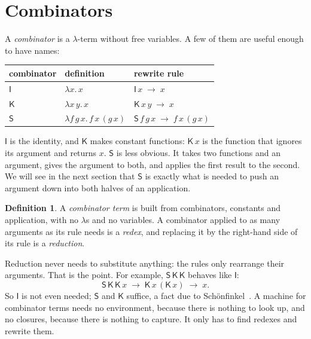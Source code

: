 \documentclass[11pt,a4paper]{article}
\newcommand{\cmb}[1]{\textsf{#1}}
\newcommand{\I}{\cmb{I}}
\newcommand{\K}{\cmb{K}}
\newcommand{\Sc}{\cmb{S}}
\newcommand{\red}{\;\to\;}
\theoremstyle{definition}
\newtheorem{definition}{Definition}
\theoremstyle{plain}
\begin{document}
\section{Combinators}\label{sec:combinators}

A \emph{combinator} is a $\lambda$-term without free variables. A few of them
are useful enough to have names:

\begin{center}
\begin{tabular}{@{}l l l@{}}
\toprule
combinator & definition & rewrite rule\\
\midrule
$\I$ & $\lambda x.\,x$ & $\I\,x \red x$\\
$\K$ & $\lambda x\,y.\,x$ & $\K\,x\,y \red x$\\
$\Sc$ & $\lambda f\,g\,x.\,f\,x\,(g\,x)$ & $\Sc\,f\,g\,x \red f\,x\,(g\,x)$\\
\bottomrule
\end{tabular}
\end{center}

\noindent
$\I$ is the identity, and $\K$ makes constant functions: $\K\,x$ is the
function that ignores its argument and returns $x$. $\Sc$ is less obvious.
It takes two functions and an argument, gives the argument to both, and
applies the first result to the second. We will see in the next section that
$\Sc$ is exactly what is needed to push an argument down into both halves of
an application.

\begin{definition}
A \emph{combinator term} is built from combinators, constants and
application, with no $\lambda$s and no variables. A combinator applied to as
many arguments as its rule needs is a \emph{redex}, and replacing it by the
right-hand side of its rule is a \emph{reduction}.
\end{definition}

Reduction never needs to substitute anything: the rules only rearrange their
arguments. That is the point. For example, $\Sc\,\K\,\K$ behaves like $\I$:
\[
  \Sc\,\K\,\K\,x \red \K\,x\,(\K\,x) \red x.
\]
So $\I$ is not even needed; $\Sc$ and $\K$ suffice, a fact due to
Schönfinkel~\cite{schonfinkel24}. A machine for combinator terms needs no
environment, because there is nothing to look up, and no closures, because
there is nothing to capture. It only has to find redexes and rewrite them.

\end{document}

